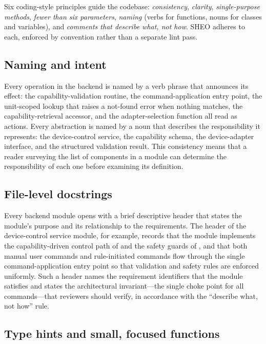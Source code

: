 Six coding-style principles guide the codebase: \emph{consistency},
\emph{clarity}, \emph{single-purpose methods}, \emph{fewer than six parameters},
\emph{naming} (verbs for functions, nouns for classes and variables), and
\emph{comments that describe what, not how}. SHEO adheres to each, enforced by
convention rather than a separate lint pass.

\subsection{Naming and intent}

Every operation in the backend is named by a verb phrase that announces its effect:
the capability-validation routine, the command-application entry point, the
unit-scoped lookup that raises a not-found error when nothing matches, the
capability-retrieval accessor, and the adapter-selection function all read as actions.
Every abstraction is named by a noun that describes the responsibility it represents:
the device-control service, the capability schema, the device-adapter interface, and
the structured validation result. This consistency means that a reader surveying the
list of components in a module can determine the responsibility of each one before
examining its definition.

\subsection{File-level docstrings}

Every backend module opens with a brief descriptive header that states the module's
purpose and its relationship to the requirements. The header of the device-control
service module, for example, records that the module implements the capability-driven
control path of  and the safety guards of , and that both
manual user commands and rule-initiated commands flow through the single
command-application entry point so that validation and safety rules are enforced
uniformly. Such a header names the requirement identifiers that the module satisfies
and states the architectural invariant---the single choke point for all commands---that
reviewers should verify, in accordance with the ``describe what, not how'' rule.

\subsection{Type hints and small, focused functions}

